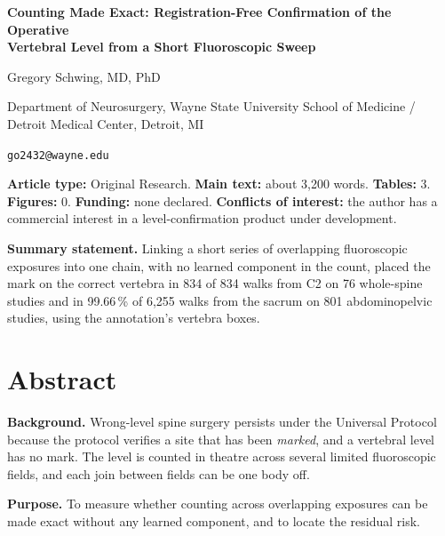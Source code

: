 \documentclass[11pt,letterpaper]{article}
\begin{document}
\begin{center}
{\Large\bfseries Counting Made Exact: Registration-Free Confirmation of the Operative\\[2pt]
Vertebral Level from a Short Fluoroscopic Sweep\par}
\vspace{0.9em}
{\normalsize Gregory Schwing, MD, PhD\par}
{\small Department of Neurosurgery, Wayne State University School of Medicine /
Detroit Medical Center, Detroit, MI\par}
{\small \texttt{go2432@wayne.edu}\par}
\end{center}

\vspace{0.5em}
\noindent\textbf{Article type:} Original Research. \textbf{Main text:} about 3{,}200 words.
\textbf{Tables:} 3. \textbf{Figures:} 0. \textbf{Funding:} none declared.
\textbf{Conflicts of interest:} the author has a commercial interest in a level-confirmation product
under development.

\medskip
\noindent\textbf{Summary statement.} Linking a short series of overlapping fluoroscopic exposures into
one chain, with no learned component in the count, placed the mark on the correct vertebra in 834 of 834
walks from C2 on 76 whole-spine studies and in 99.66\,\% of 6{,}255 walks from the sacrum on 801
abdominopelvic studies, using the annotation's vertebra boxes.

\section*{Abstract}

\noindent\textbf{Background.} Wrong-level spine surgery persists under the Universal Protocol because
the protocol verifies a site that has been \emph{marked}, and a vertebral level has no mark. The level is
counted in theatre across several limited fluoroscopic fields, and each join between fields can be one
body off.

\noindent\textbf{Purpose.} To measure whether counting across overlapping exposures can be made exact
without any learned component, and to locate the residual risk.
\end{document}
